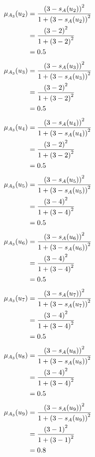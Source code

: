\documentclass[a4paper]{book}
\begin{document}
				\begin{align}
					\mu_{A_3}(u_2) &= \frac{\left(3-s_A(u_2)\right)^2}{1 + \left(3-s_A(u_2)\right)^2}\\
					&= \frac{\left(3-2\right)^2}{1 + \left(3-2\right)^2} \notag \\
					&= 0.5 \notag
				\end{align}
				\begin{align}
					\mu_{A_3}(u_3) &= \frac{\left(3-s_A(u_3)\right)^2}{1 + \left(3-s_A(u_3)\right)^2}\\
					&= \frac{\left(3-2\right)^2}{1 + \left(3-2\right)^2} \notag \\
					&= 0.5 \notag
				\end{align}
				\begin{align}
					\mu_{A_3}(u_4) &= \frac{\left(3-s_A(u_4)\right)^2}{1 + \left(3-s_A(u_4)\right)^2}\\
					&= \frac{\left(3-2\right)^2}{1 + \left(3-2\right)^2} \notag \\
					&= 0.5 \notag
				\end{align}
				\begin{align}
					\mu_{A_3}(u_5) &= \frac{\left(3-s_A(u_5)\right)^2}{1 + \left(3-s_A(u_5)\right)^2}\\
					&= \frac{\left(3-4\right)^2}{1 + \left(3-4\right)^2} \notag \\
					&= 0.5 \notag
				\end{align}
				\begin{align}
					\mu_{A_3}(u_6) &= \frac{\left(3-s_A(u_6)\right)^2}{1 + \left(3-s_A(u_6)\right)^2}\\
					&= \frac{\left(3-4\right)^2}{1 + \left(3-4\right)^2} \notag \\
					&= 0.5 \notag
				\end{align}
				\begin{align}
					\mu_{A_3}(u_7) &= \frac{\left(3-s_A(u_7)\right)^2}{1 + \left(3-s_A(u_7)\right)^2}\\
					&= \frac{\left(3-4\right)^2}{1 + \left(3-4\right)^2} \notag \\
					&= 0.5 \notag
				\end{align}
				\begin{align}
					\mu_{A_3}(u_8) &= \frac{\left(3-s_A(u_8)\right)^2}{1 + \left(3-s_A(u_8)\right)^2}\\
					&= \frac{\left(3-4\right)^2}{1 + \left(3-4\right)^2} \notag \\
					&= 0.5 \notag
				\end{align}
				\begin{align}
					\mu_{A_3}(u_9) &= \frac{\left(3-s_A(u_9)\right)^2}{1 + \left(3-s_A(u_9)\right)^2}\\
					&= \frac{\left(3-1\right)^2}{1 + \left(3-1\right)^2} \notag \\
					&= 0.8 \notag
				\end{align}
\end{document}
